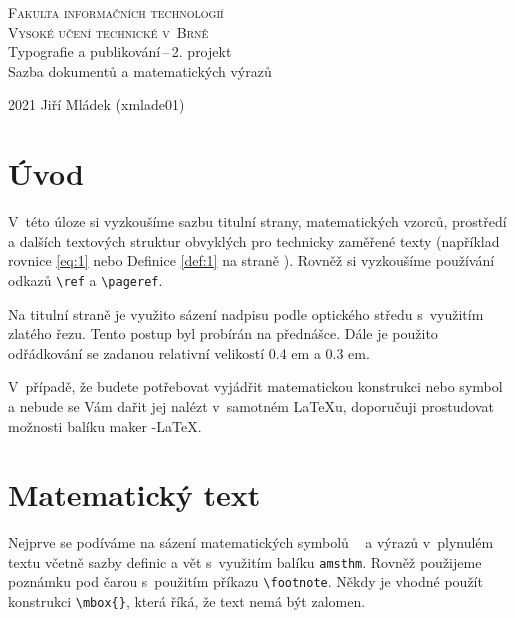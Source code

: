 \documentclass[draft, 11pt, a4paper,twocolumn]{article}
\begin{document}
\begin{titlepage}
    \begin{center}
        \Huge
        \textsc{Fakulta informačních technologií}\\
        \textsc{Vysoké učení technické v~Brně}\\
        \LARGE
        Typografie a publikování\,--\,2. projekt\\
        Sazba dokumentů a matematických výrazů\\
    \end{center}
    {\Large 2021 \hfill Jiří Mládek (xmlade01)}
\end{titlepage}


\section*{Úvod}
V~této úloze si vyzkoušíme sazbu titulní strany, matematic\-kých vzorců, prostředí a dalších textových struktur obvyklých pro technicky zaměřené texty (například rovnice \eqref{eq:1}
nebo Definice \ref{def:1} na straně \pageref{def:1}). Rovněž si vyzkoušíme používání odkazů \verb|\ref| a \verb|\pageref|.

Na titulní straně je využito sázení nadpisu podle optického středu s~využitím zlatého řezu. Tento postup byl probírán na přednášce. Dále je použito odřádkování se zadanou relativní velikostí 0.4 em a 0.3 em.

V~případě, že budete potřebovat vyjádřit matematickou konstrukci nebo symbol a nebude se Vám dařit jej nalézt v~samotném \LaTeX u, doporučuji prostudovat možnosti balíku maker \AmS -\LaTeX.

\section{Matematický text}
Nejprve se podíváme na sázení matematických symbolů ~ a výrazů v~plynulém textu včetně sazby definic a vět s~využitím balíku \verb|amsthm|. Rovněž použijeme poznámku pod čarou s~použitím příkazu \verb|\footnote|. Někdy je vhodné použít konstrukci \verb|\mbox{}|, která říká, že text nemá být zalomen.
\end{document}
